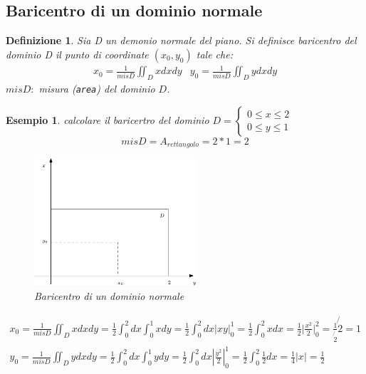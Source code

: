 \documentclass{book}
\newtheorem{defi}{Definizione}
\newtheorem{esempio}{Esempio}
\newcommand{\abs}[1]{\lvert#1\rvert}
\begin{document}
\subsection{Baricentro di un dominio normale}
\begin{defi}
  Sia D un demonio normale del piano. Si definisce {\color{red}baricentro del dominio} D il punto di
  coordinate $(x_0,y_0)$ tale che:
  \begin{equation*}
    \begin{matrix}
      x_0=\frac{1}{mis D} \iint_D xdxdy & y_0=\frac{1}{mis D} \iint_D ydxdy
    \end{matrix}
  \end{equation*}
  $mis D:$ misura ({\tt area}) del dominio $D$.
\end{defi}
\begin{esempio}
  calcolare il baricertro del dominio $D=\begin{cases}
                                           0\leq x\leq 2\\
                                           0\leq y\leq 1
                                         \end{cases}$
  \begin{equation*}
    mis D=A_{rettangolo}=2*1=2
  \end{equation*}
  \begin{figure}[ht]
    \centering
    \includegraphics[width=6cm]{img/finiti/baricentrodiundominionormale.eps}
    \caption{Baricentro di un dominio normale}
  \end{figure}
  \begin{equation*}
    \begin{matrix}
      x_0=\frac{1}{mis D}\iint_D xdxdy=\frac{1}{2}\int_0^2dx\int_0^1xdy=\frac{1}{2}\int^2_0dx\abs{xy}_0^1= \frac{1}{2}\int_0^2xdx=\frac{1}{2}\abs{\frac{x^2}{2}}_0^2=\frac{1}{\not{2}}\not{2}=1\\
      y_0=\frac{1}{mis D}\iint_D ydxdy=\frac{1}{2}\int_0^2dx\int_0^1ydy=\frac{1}{2}\int_0^2dx\left|\frac{y^2}{2}\right|^1_0=\frac{1}{2}\int^2_0\frac{1}{2}dx=\frac{1}{4}\left|x\right|=\frac{1}{2}
    \end{matrix}
  \end{equation*}
  
\end{esempio}
\printindex
\end{document}
